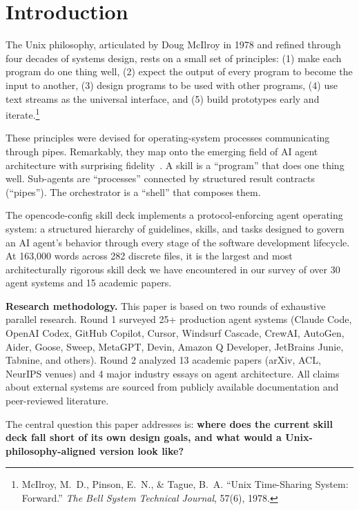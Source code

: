 \documentclass[11pt,a4paper]{article}
\begin{document}
\section{Introduction}

The Unix philosophy, articulated by Doug McIlroy in 1978 and refined through four decades of systems design, rests on a small set of principles: (1) make each program do one thing well, (2) expect the output of every program to become the input to another, (3) design programs to be used with other programs, (4) use text streams as the universal interface, and (5) build prototypes early and iterate.\footnote{McIlroy, M.~D., Pinson, E.~N., \& Tague, B.~A.  ``Unix Time-Sharing System: Forward.'' \emph{The Bell System Technical Journal}, 57(6), 1978.}

These principles were devised for operating-system processes communicating through pipes.  Remarkably, they map onto the emerging field of AI agent architecture with surprising fidelity~\cite{piskala2026unix}.  A skill is a ``program'' that does one thing well.  Sub-agents are ``processes'' connected by structured result contracts (``pipes'').  The orchestrator is a ``shell'' that composes them.

The opencode-config skill deck implements a protocol-enforcing agent operating system: a structured hierarchy of guidelines, skills, and tasks designed to govern an AI agent's behavior through every stage of the software development lifecycle.  At 163,000 words across 282 discrete files, it is the largest and most architecturally rigorous skill deck we have encountered in our survey of over 30 agent systems and 15 academic papers.

\begin{quotebox}
\textbf{Research methodology.}  This paper is based on two rounds of exhaustive parallel research.  Round 1 surveyed 25+ production agent systems (Claude Code, OpenAI Codex, GitHub Copilot, Cursor, Windsurf Cascade, CrewAI, AutoGen, Aider, Goose, Sweep, MetaGPT, Devin, Amazon Q Developer, JetBrains Junie, Tabnine, and others).  Round 2 analyzed 13 academic papers (arXiv, ACL, NeurIPS venues) and 4 major industry essays on agent architecture.  All claims about external systems are sourced from publicly available documentation and peer-reviewed literature.
\end{quotebox}

The central question this paper addresses is: \textbf{where does the current skill deck fall short of its own design goals, and what would a Unix-philosophy-aligned version look like?}
\end{document}
